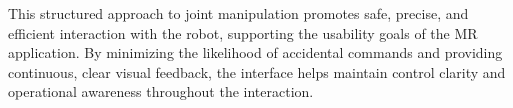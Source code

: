 This structured approach to joint manipulation promotes safe, precise, and efficient interaction with the robot, supporting the usability goals of the \ac{MR} application. By minimizing the likelihood of accidental commands and providing continuous, clear visual feedback, the interface helps maintain control clarity and operational awareness throughout the interaction.


    
    
    
